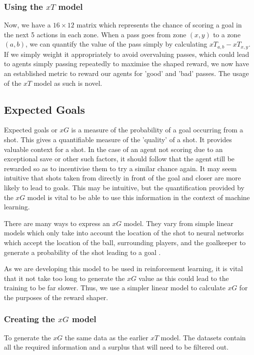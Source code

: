 \documentclass[11pt]{article}
\begin{document}
\subsubsection{Using the $xT$ model}
Now, we have a $16 \times 12$ matrix which represents the chance of scoring a goal in the next 5 actions in each zone. When a pass goes from zone $(x, y)$ to a zone $(a, b)$, we can quantify the value of the pass simply by calculating ${x T}_{a, b} - {x T}_{x, y}$. If we simply weight it appropriately to avoid overvaluing passes, which could lead to agents simply passing repeatedly to maximise the shaped reward, we now have an established metric to reward our agents for 'good' and 'bad' passes. The usage of the $xT$ model as such is novel.

\subsection{Expected Goals}

Expected goals \cite{mead2023expected} or $xG$ is a measure of the probability of a goal occurring from a shot. This gives a quantifiable measure of the 'quality' of a shot. It provides valuable context for a shot. In the case of an agent not scoring due to an exceptional save or other such factors, it should follow that the agent still be rewarded so as to incentivise them to try a similar chance again. It may seem intuitive that shots taken from directly in front of the goal and closer are more likely to lead to goals. This may be intuitive, but the quantification provided by the $xG$ model is vital to be able to use this information in the context of machine learning.

There are many ways to express an $xG$ model. They vary from simple linear models which only take into account the location of the shot to neural networks which accept the location of the ball, surrounding players, and the goalkeeper to generate a probability of the shot leading to a goal \cite{deepxG_2019}.

As we are developing this model to be used in reinforcement learning, it is vital that it not take too long to generate the $xG$ value as this could lead to the training to be far slower. Thus, we use a simpler linear model to calculate $xG$ for the purposes of the reward shaper.

\subsubsection{Creating the $xG$ model}
To generate the $xG$ the same data as the earlier $xT$ model. The datasets contain all the required information and a surplus that will need to be filtered out.
\end{document}
